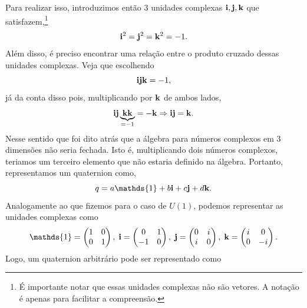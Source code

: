\documentclass{article}
\numberwithin{equation}{section}
\numberwithin{figure}{section}
\begin{document}
Para realizar isso, introduzimos então 3 unidades complexas $\vb{i},\vb{j},\vb{k}$ que satisfazem,\footnote{É importante notar que essas unidades complexas não são vetores. A notação é apenas para facilitar a compreensão.} 
\begin{equation}
	\vb{i}^2=\vb{j}^2=\vb{k}^2=-1.
\end{equation}
Além disso, é preciso encontrar uma relação entre o produto cruzado dessas unidades complexas. Veja que escolhendo 
\begin{equation}
	\vb{i}\vb{j}\vb{k}=-1,
\end{equation}
já da conta disso pois, multiplicando por $\vb{k}$ de ambos lados,
\begin{equation}
	\vb{i}\vb{j}\underbrace{\vb{k}\vb{k}}_{=-1}=-\vb{k}\Rightarrow \vb{i}\vb{j}=\vb{k}.
\end{equation}
Nesse sentido que foi dito atrás que a álgebra para números complexos em 3 dimensões não seria fechada. Isto é, multiplicando dois números complexos, teriamos um terceiro elemento que não estaria definido na álgebra. Portanto, representamos um quaternion como, 
\begin{equation}
	q=a\mathds{1}+b\vb{i}+c\vb{j}+d\vb{k}.
\end{equation}
Analogamente ao que fizemos para o caso de $U(1)$, podemos representar as unidades complexas como 
\begin{equation}
	\mathds{1}=\begin{pmatrix}
		1 & 0 \\
		0 & 1
	\end{pmatrix},\;\vb{i}=\begin{pmatrix}
	0 & 1 \\
	-1 & 0
	\end{pmatrix},\;\vb{j}=\begin{pmatrix}
	0 & i \\
	i & 0
	\end{pmatrix},\;\vb{k}=\begin{pmatrix}
	i & 0 \\
	0 & -i
	\end{pmatrix}.
\end{equation}
Logo, um quaternion arbitrário pode ser representado como 
\end{document}
